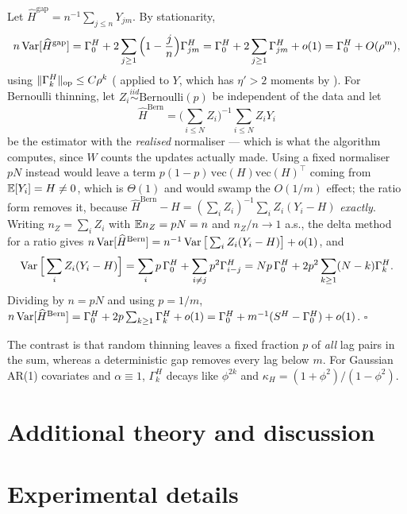 Let $\widehat H^{\mathrm{gap}}=n^{-1}\sum_{j\le n}Y_{jm}$. By stationarity,
\[
n\operatorname{Var}[\widehat H^{\mathrm{gap}}]
=\Gamma_0^H+2\sum_{j\ge1}\Big(1-\frac jn\Big)\Gamma^H_{jm}
=\Gamma_0^H+2\sum_{j\ge1}\Gamma^H_{jm}+o(1)
=\Gamma_0^H+O(\rho^{m}),
\]
using $\lVert \Gamma^H_k \rVert_{\mathrm{op}}\le C\rho^{k}$ ( applied to $Y$, which has
$\eta'>2$ moments by ). For Bernoulli thinning, let $Z_i\stackrel{iid}{\sim}\mathrm{Bernoulli}(p)$ be independent of
the data and let
\[
\widehat H^{\mathrm{Bern}}=\Big(\sum_{i\le N}Z_i\Big)^{-1}\sum_{i\le N}Z_iY_i
\]
be the estimator with the \emph{realised} normaliser --- which is what the algorithm computes,
since $W$ counts the updates actually made. Using a fixed normaliser $pN$ instead would leave
a term $p(1-p)\,\mathrm{vec}(H)\mathrm{vec}(H)^{\!\top}$ coming from $\mathbb{E}[Y_i]=H\ne0$, which is
$\Theta(1)$ and would swamp the $O(1/m)$ effect; the ratio form removes it, because
$\widehat H^{\mathrm{Bern}}-H
=(\sum_iZ_i)^{-1}\sum_iZ_i(Y_i-H)$ \emph{exactly}. Writing $n_Z=\sum_iZ_i$ with
$\mathbb{E} n_Z=pN=n$ and $n_Z/n\to1$ a.s., the delta method for a ratio gives
$n\operatorname{Var}[\widehat H^{\mathrm{Bern}}]=n^{-1}\operatorname{Var}\big[\sum_iZ_i(Y_i-H)\big]+o(1)$, and
\[
\operatorname{Var}\Big[\sum_iZ_i(Y_i-H)\Big]
=\sum_ip\,\Gamma^H_0+\sum_{i\ne j}p^2\Gamma^H_{i-j}
=Np\,\Gamma^H_0+2p^2\sum_{k\ge1}(N-k)\Gamma^H_k .
\]
Dividing by $n=pN$ and using $p=1/m$,
$n\operatorname{Var}[\widehat H^{\mathrm{Bern}}]=\Gamma^H_0+2p\sum_{k\ge1}\Gamma^H_k+o(1)
=\Gamma^H_0+m^{-1}(S^H-\Gamma^H_0)+o(1)$. \hfill$\square$

\begin{remark}
The contrast is that random thinning leaves a fixed fraction $p$ of \emph{all} lag pairs in
the sum, whereas a deterministic gap removes every lag below $m$. For Gaussian AR(1)
covariates and $\alpha\equiv1$, $\Gamma^H_k$ decays like $\phi^{2k}$ and
$\kappa_H=(1+\phi^2)/(1-\phi^2)$.
\end{remark}

\section{Additional theory and discussion}
\label{app:theorydetail}



\section{Experimental details}
\label{app:details}



